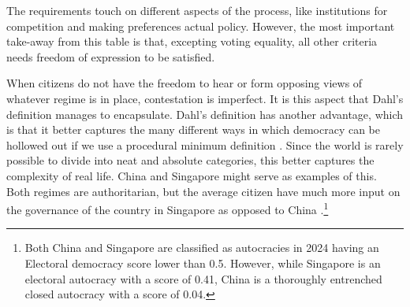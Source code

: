 The requirements touch on different aspects of the process, like institutions for competition and making preferences actual policy. However, the most important take-away from this table is that, excepting voting equality, all other criteria needs freedom of expression to be satisfied.

When citizens do not have the freedom to hear or form opposing views of whatever regime is in place, contestation is imperfect. It is this aspect that Dahl's definition manages to encapsulate. Dahl's definition has another advantage, which is that it better captures the many different ways in which democracy can be hollowed out if we use a procedural minimum definition \citep{varol_stealth_2015}. Since the world is rarely possible to divide into neat and absolute categories, this better captures the complexity of real life. China and Singapore might serve as examples of this. Both regimes are authoritarian, but the average citizen have much more input on the governance of the country in Singapore as opposed to China \citep[pp. 62-63]{nord_democracy_2025}.\footnote{Both China and Singapore are classified as autocracies in 2024 having an Electoral democracy score lower than 0.5. However,  while Singapore is an electoral autocracy \citep[p. 14]{nord_democracy_2025} with a score of 0.41, China is a thoroughly entrenched closed autocracy with a score of 0.04.\citep{nord_democracy_2025}} 

